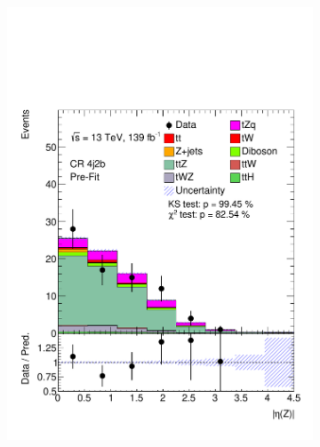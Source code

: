 \begin{figure}[!h] 
  \begin{subfigure}[b]{0.33\linewidth}
    \centering
    \includegraphics[width=\linewidth]{ubonn-thesis/Chapters/Chapters_06/Figure/Input_distribution/CR_4j2b_Z_eta.pdf} 
  \end{subfigure} 
  \begin{subfigure}[b]{0.33\linewidth}
    \centering

\end{subfigure}
\end{figure}

